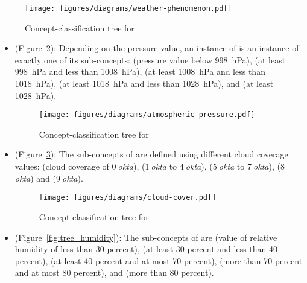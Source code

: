 \begin{figure}
  \centering
  \texttt{[image: figures/diagrams/weather-phenomenon.pdf]}
  \caption{Concept-classification tree for }
  \label{fig:tree_weather_phenomenon}
\end{figure}

\begin{itemize}
  \item {} (Figure~\ref{fig:tree_atmospheric_pressure}): Depending on the pressure value, an instance of  is an instance of exactly one of its sub-concepts:  (pressure value below \SI{998}{\hecto\pascal}),  (at least \SI{998}{\hecto\pascal} and less than \SI{1008}{\hecto\pascal}),  (at least \SI{1008}{\hecto\pascal} and less than \SI{1018}{\hecto\pascal}),  (at least \SI{1018}{\hecto\pascal} and less than \SI{1028}{\hecto\pascal}), and  (at least \SI{1028}{\hecto\pascal}).
  
  \begin{figure}
    \centering
    \texttt{[image: figures/diagrams/atmospheric-pressure.pdf]}
    \caption{Concept-classification tree for }
    \label{fig:tree_atmospheric_pressure}
  \end{figure}

  \item {} (Figure~\ref{fig:tree_cloud_cover}): The sub-concepts of  are defined using different cloud coverage values:  (cloud coverage of \num{0}$\:$\emph{okta}),  (\num{1}$\:$\emph{okta} to \num{4}$\:$\emph{okta}),  (\num{5}$\:$\emph{okta} to \num{7}$\:$\emph{okta}),  (\num{8}$\:$\emph{okta}) and  (\num{9}$\:$\emph{okta}).
  
  \begin{figure}
    \centering
    \texttt{[image: figures/diagrams/cloud-cover.pdf]}
    \caption{Concept-classification tree for }
    \label{fig:tree_cloud_cover}
  \end{figure}

  \item {} (Figure~\ref{fig:tree_humidity}): The sub-concepts of  are  (value of relative humidity of less than \num{30} percent),  (at least \num{30} percent and less than \num{40} percent),  (at least \num{40} percent and at most \num{70} percent),  (more than \num{70} percent and at most \num{80} percent), and  (more than \num{80} percent).
  

\end{itemize}
